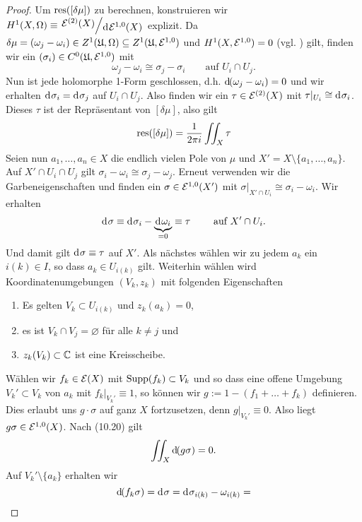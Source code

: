 \begin{proof}
  Um $\operatorname{res}([\delta \mu])$ zu berechnen, konstruieren wir $H^1(X,
  \Omega) \equiv \quot{\diff^{(2)}(X)}{\d[\diff^{1,0}(X)]}$
  explizit. Da $\delta \mu = (\omega_j - \omega_i) \in Z^1(\mathfrak{U},
  \Omega) \subseteq Z^1(\mathfrak{U}, \mathcal{E}^{1,0})$ und $H^1(X, \mathcal{E}^{1,0}) =
  0$ (vgl. \cite[Satz 12.6]{For}) gilt, finden wir ein
  $(\sigma_i) \in C^0(\mathfrak{U}, \mathcal{E}^{1,0})$ mit
  \[
  \omega_j - \omega_i \cong \sigma_j - \sigma_i \qquad \text{auf } U_i
  \cap U_j.
  \]
  Nun ist jede holomorphe 1-Form geschlossen, d.h. $\d[(\omega_j -
  \omega_i)] = 0$ und wir erhalten $\d[\sigma_i] = \d[\sigma_j]$ auf
  $U_i \cap U_j$. Also finden wir ein $ \tau \in \mathcal{E}^{(2)}(X)$ mit
  $\tau|_{U_i} \cong \d[\sigma_i]$. Dieses $\tau$ ist der Repräsentant
  von $[\delta \mu]$, also gilt
  \[
  \operatorname{res}([\delta \mu]) = \frac{1}{2\pi i} \iint_X \tau
  \]
  Seien nun $a_1, \dots, a_n \in X$ die endlich vielen Pole von $\mu$
  und $X' = X \setminus \{a_1, \dots, a_n\}$. Auf $X' \cap U_i \cap
  U_j$ gilt $\sigma_i - \omega_i \cong \sigma_j - \omega_j$. Erneut
  verwenden wir die Garbeneigenschaften und finden ein $\sigma \in
  \mathcal{E}^{1,0}(X')$ mit $\sigma|_{X' \cap U_i} \cong \sigma_i -
  \omega_i$. Wir erhalten
  \[
  \d[\sigma] \equiv \d[\sigma_i] - \underbrace{\d[\omega_i]}_{= 0} \equiv \tau
  \qquad \text{ auf } X' \cap U_i.
  \]
  Und damit gilt $\d[\sigma] \equiv \tau$ auf $X'$. Als nächstes
  wählen wir zu jedem $a_k$ ein $i(k) \in I$, so dass $a_k \in
  U_{i(k)}$ gilt. Weiterhin wählen wird Koordinatenumgebungen $(V_k,
  z_k)$ mit folgenden Eigenschaften
  \begin{enumerate}
  \item Es gelten $V_k \subset U_{i(k)}$ und $z_k(a_k) = 0$,
  \item es ist $V_k \cap V_j = \varnothing$ für alle $k \neq j$ und
  \item $z_k(V_k) \subset \mathbb{C}$ ist eine Kreisscheibe.
  \end{enumerate}
  Wählen wir $f_k \in \mathcal{E}(X)$ mit $\operatorname{Supp}(f_k) \subset V_k$ und so
  dass eine offene Umgebung $V_k' \subset V_k$ von $a_k$ mit
  $f_k|_{V_k'} \equiv 1$, so können wir $g:= 1 - (f_1 + \dots + f_k)$
  definieren. Dies erlaubt uns $g \cdot \sigma$ auf ganz $X$
  fortzusetzen, denn $g|_{V_k'} \equiv 0$. Also liegt $g \sigma \in
  \mathcal{E}^{1,0}(X)$. Nach (10.20) gilt
  \begin{align}
  \iint_X \d[(g \sigma)] = 0. \label{eq:g-sigma}
  \end{align}
  Auf $V_k' \setminus \{a_k\}$ erhalten wir
  \[
  \d[(f_k \sigma)] = \d[\sigma] = \d[\sigma_{i(k)} - \omega_{i(k)}] =
\]
\end{proof}
